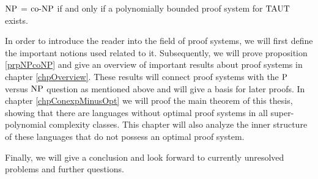   \begin{proposition} \label{prpNPcoNP}
    \(\NP\) = \(\coNP\) if and only if a polynomially bounded proof system for \(\TAUT\) exists.
  \end{proposition}

  In order to introduce the reader into the field of proof systems, we will first define the important notions used related to it. Subsequently, we will prove proposition \ref{prpNPcoNP} and give an overview of important results about proof systems in chapter \ref{chpOverview}. These results will connect proof systems with the \(\P\) versus \(\NP\) question as mentioned above and will give a basis for later proofs.
  In chapter \ref{chpConexpMinusOpt} we will proof the main theorem of this thesis, showing that there are languages without optimal proof systems in all super-polynomial complexity classes. This chapter will also analyze the inner structure of these languages that do not possess an optimal proof system.

  Finally, we will give a conclusion and look forward to currently unresolved problems and further questions.

